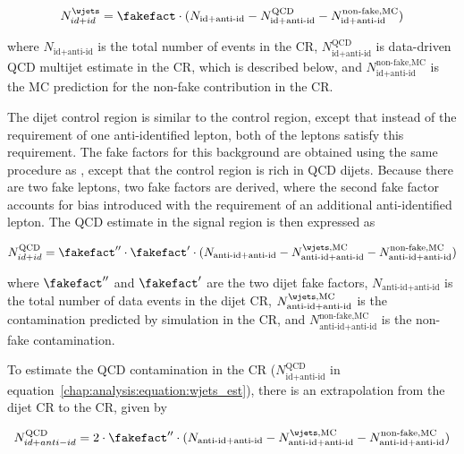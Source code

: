 \begin{equation}
\label{chap:analysis:equation:wjets_est}
N_{id+id}^{\wjets} = \fakefact\cdot (N_{\textrm{id+anti-id}} -
N_{\textrm{id+anti-id}}^{\textrm{QCD}} -
N_{\textrm{id+anti-id}}^{\textrm{non-fake,MC}})
\end{equation}

\noindent
where $N_{\textrm{id+anti-id}}$ is the total number of events in the
\wjets CR, $N_{\textrm{id+anti-id}}^{\textrm{QCD}}$ is data-driven QCD
multijet estimate in the \wjets CR, which is described below, and
$N_{\textrm{id+anti-id}}^{\textrm{non-fake,MC}}$ is the MC prediction
for the non-fake contribution in the \wjets CR. 

The dijet control region is similar to the \wjets control region,
except that instead of the requirement of one anti-identified lepton,
both of the leptons satisfy this requirement. The fake factors for
this background are obtained using the same procedure as \wjets,
except that the control region is rich in QCD dijets. Because there
are two fake leptons, two fake factors are derived, where the second
fake factor accounts for bias introduced with the requirement of an
additional anti-identified lepton. The QCD estimate in the signal
region is then expressed as

\begin{equation}
N_{id+id}^{\textrm{QCD}} = \fakefact^{\prime\prime}\cdot\fakefact^{\prime}\cdot (N_{\textrm{anti-id+anti-id}} -
N_{\textrm{anti-id+anti-id}}^{\wjets\textrm{,MC}} -
N_{\textrm{anti-id+anti-id}}^{\textrm{non-fake,MC}})
\end{equation}

\noindent
where $\fakefact^{\prime\prime}$ and $\fakefact^{\prime}$ are the two
dijet fake factors, $N_{\textrm{anti-id+anti-id}}$ is the total number
of data events in the dijet CR,
$N_{\textrm{anti-id+anti-id}}^{\wjets\textrm{,MC}}$ is the \wjets
contamination predicted by simulation in the CR, and
$N_{\textrm{anti-id+anti-id}}^{\textrm{non-fake,MC}}$ is the non-fake
contamination. 

To estimate the QCD contamination in the \wjets CR
($N_{\textrm{id+anti-id}}^{\textrm{QCD}}$ in
equation~\ref{chap:analysis:equation:wjets_est}), there is an
extrapolation from the dijet CR to the \wjets CR, given by

\begin{equation}
N_{id+anti-id}^{\textrm{QCD}} = 2\cdot\fakefact^{\prime\prime}\cdot (N_{\textrm{anti-id+anti-id}} -
N_{\textrm{anti-id+anti-id}}^{\wjets\textrm{,MC}} -
N_{\textrm{anti-id+anti-id}}^{\textrm{non-fake,MC}})
\end{equation}

